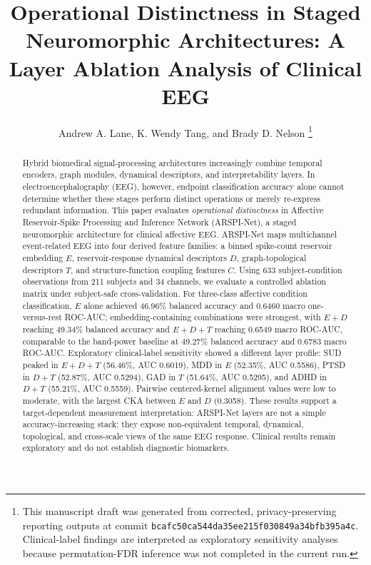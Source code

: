 \documentclass[journal]{IEEEtran}
\begin{document}
\title{Operational Distinctness in Staged Neuromorphic Architectures: A Layer Ablation Analysis of Clinical EEG}

\author{Andrew A. Lane, K. Wendy Tang, and Brady D. Nelson%
\thanks{This manuscript draft was generated from corrected, privacy-preserving reporting outputs at commit \texttt{bcafc50ca544da35ee215f030849a34bfb395a4c}. Clinical-label findings are interpreted as exploratory sensitivity analyses because permutation-FDR inference was not completed in the current run.}%
}

\maketitle

\begin{abstract}
Hybrid biomedical signal-processing architectures increasingly combine temporal encoders, graph modules, dynamical descriptors, and interpretability layers. In electroencephalography (EEG), however, endpoint classification accuracy alone cannot determine whether these stages perform distinct operations or merely re-express redundant information. This paper evaluates \emph{operational distinctness} in Affective Reservoir-Spike Processing and Inference Network (ARSPI-Net), a staged neuromorphic architecture for clinical affective EEG. ARSPI-Net maps multichannel event-related EEG into four derived feature families: a binned spike-count reservoir embedding $E$, reservoir-response dynamical descriptors $D$, graph-topological descriptors $T$, and structure-function coupling features $C$. Using 633 subject-condition observations from 211 subjects and 34 channels, we evaluate a controlled ablation matrix under subject-safe cross-validation. For three-class affective condition classification, $E$ alone achieved 46.96\% balanced accuracy and 0.6460 macro one-versus-rest ROC-AUC; embedding-containing combinations were strongest, with $E+D$ reaching 49.34\% balanced accuracy and $E+D+T$ reaching 0.6549 macro ROC-AUC, comparable to the band-power baseline at 49.27\% balanced accuracy and 0.6783 macro ROC-AUC. Exploratory clinical-label sensitivity showed a different layer profile: SUD peaked in $E+D+T$ (56.46\%, AUC 0.6019), MDD in $E$ (52.35\%, AUC 0.5586), PTSD in $D+T$ (52.87\%, AUC 0.5294), GAD in $T$ (51.64\%, AUC 0.5295), and ADHD in $D+T$ (55.21\%, AUC 0.5559). Pairwise centered-kernel alignment values were low to moderate, with the largest CKA between $E$ and $D$ (0.3058). These results support a target-dependent measurement interpretation: ARSPI-Net layers are not a simple accuracy-increasing stack; they expose non-equivalent temporal, dynamical, topological, and cross-scale views of the same EEG response. Clinical results remain exploratory and do not establish diagnostic biomarkers.
\end{abstract}
\end{document}
